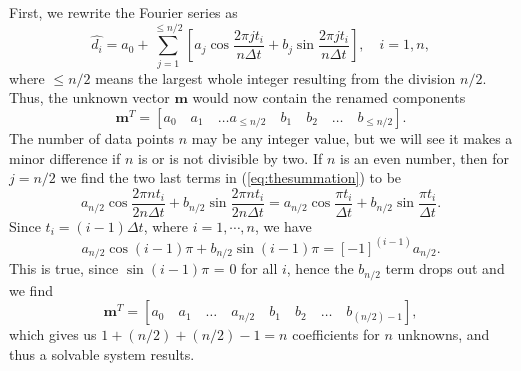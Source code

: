 First, we rewrite the Fourier series as
\begin{equation}
\hat{d_i} = a_0 + \sum^{\leq n/2}_{j=1} \left[ a_j \cos \frac{2 \pi jt_i}{n \Delta t}
 + b_j \sin \frac{2 \pi jt_i}{n \Delta t} \right],\quad i = 1,n,
\label{eq:thesummation}
\end{equation}
where $\leq n/2$ means the largest whole integer resulting from the division $n/2$.
Thus, the unknown vector $\mathbf{m}$ would now contain the renamed components
\begin{equation}
\mathbf{m}^T = \left[ a_0 \quad a_1 \quad \dots a_ {\leq n/2} \quad b_1 \quad b_2 \quad \dots \quad b_{\leq n/2} \right] .
\end{equation}
The number of data points $n$ may be any integer value, but we will see it makes a minor difference if $n$ is or is not divisible by two.
If $n$ is an even number, then for $j = n/2$ we find the two last terms in (\ref{eq:thesummation}) to be
\begin{equation}
a_{n/2} \cos \frac{2 \pi n t_i}{2n \Delta t} + b_{n/2} \sin \frac{2 \pi n t_i}{2n \Delta t} = a_{n/2} \cos \frac { \pi t_i}{ \Delta t} + b_{n/2} \sin \frac{ \pi t_i}{ \Delta t}.
\end{equation}
Since $t_i = (i-1) \Delta t$, where $i = 1, \cdots , n$, we have
\begin{equation}
a_{n/2} \cos (i-1) \pi + b_{n/2} \sin (i-1) \pi = \left[-1 \right]^{(i-1)} a_{n/2}.
\end{equation}
This is true, since $\sin (i-1) \pi$ = 0 for all $i$, hence the $b_{n/2}$ term drops out and we find
\begin{equation}
\mathbf{m}^T = \left[ a_0 \quad a_1 \quad \dots \quad a_{n/2} \quad b_1 \quad b_2 \quad \dots \quad  b_{(n/2)-1} \right],
\end{equation}
which gives us $1 + (n/2) + (n/2) - 1 = n$ coefficients for $n$ unknowns, and thus a solvable system results.

